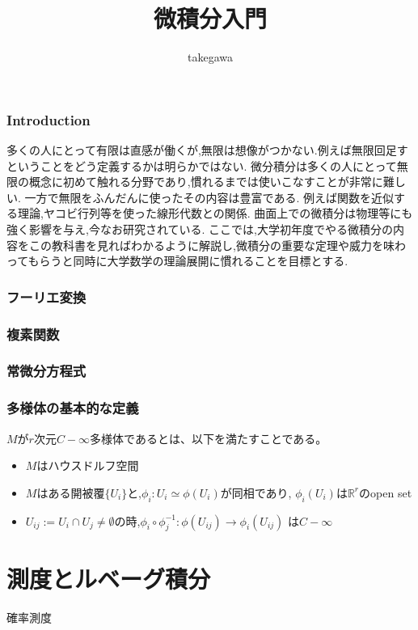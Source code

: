 \documentclass{ujarticle}
\title{微積分入門}
\author{takegawa}
\date{}
\begin{document}
\maketitle
\tableofcontents

\section{Introduction}
多くの人にとって有限は直感が働くが,無限は想像がつかない.例えば無限回足すということをどう定義するかは明らかではない.
微分積分は多くの人にとって無限の概念に初めて触れる分野であり,慣れるまでは使いこなすことが非常に難しい.
一方で無限をふんだんに使ったその内容は豊富である.
例えば関数を近似する理論,ヤコビ行列等を使った線形代数との関係.
曲面上での微積分は物理等にも強く影響を与え,今なお研究されている.
ここでは,大学初年度でやる微積分の内容をこの教科書を見ればわかるように解説し,微積分の重要な定理や威力を味わってもらうと同時に大学数学の理論展開に慣れることを目標とする.









\section{フーリエ変換}

\section{複素関数}

\section{常微分方程式}

\section{多様体の基本的な定義}
\begin{dfn}
$M$が$r$次元$C-{\infty}$多様体であるとは、以下を満たすことである。
\begin{itemize}
   \item $M$はハウスドルフ空間
   \item $M$はある開被覆$\{U_i\}$と,$\phi_i:U_i \simeq \phi(U_i)$が同相であり,
         $\phi_i(U_i)$は$\mathbb{R}^r$のopen set
   \item $U_{ij} := U_i \cap U_j \neq \emptyset$の時,$\phi_i \circ \phi_j^{-1}: \phi(U_{ij}) \to \phi_i(U_{ij})$
         は$C-\infty$
\end{itemize}
\end{dfn}

\part{測度とルベーグ積分}
確率測度
\end{document}
